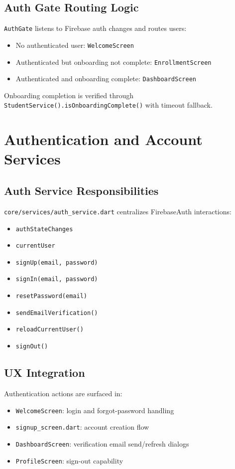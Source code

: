 \documentclass[11pt,a4paper]{article}
\begin{document}
\subsection{Auth Gate Routing Logic}
\texttt{AuthGate} listens to Firebase auth changes and routes users:
\begin{itemize}
  \item No authenticated user: \texttt{WelcomeScreen}
  \item Authenticated but onboarding not complete: \texttt{EnrollmentScreen}
  \item Authenticated and onboarding complete: \texttt{DashboardScreen}
\end{itemize}

Onboarding completion is verified through \texttt{StudentService().isOnboardingComplete()} with timeout fallback.

\section{Authentication and Account Services}
\subsection{Auth Service Responsibilities}
\texttt{core/services/auth\_service.dart} centralizes FirebaseAuth interactions:
\begin{itemize}
  \item \texttt{authStateChanges}
  \item \texttt{currentUser}
  \item \texttt{signUp(email, password)}
  \item \texttt{signIn(email, password)}
  \item \texttt{resetPassword(email)}
  \item \texttt{sendEmailVerification()}
  \item \texttt{reloadCurrentUser()}
  \item \texttt{signOut()}
\end{itemize}

\subsection{UX Integration}
Authentication actions are surfaced in:
\begin{itemize}
  \item \texttt{WelcomeScreen}: login and forgot-password handling
  \item \texttt{signup\_screen.dart}: account creation flow
  \item \texttt{DashboardScreen}: verification email send/refresh dialogs
  \item \texttt{ProfileScreen}: sign-out capability
\end{itemize}
\end{document}
